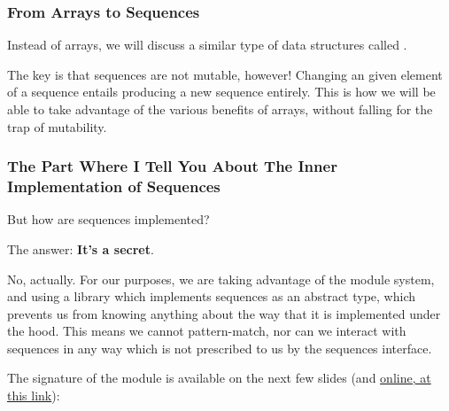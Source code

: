 \documentclass[aspectratio=169, handout]{beamer}
\begin{document}
\begin{frame}[fragile]
  \frametitle{From Arrays to Sequences}

  \tgs

  Instead of arrays, we will discuss a similar type of data structures called
  .

  \pause
  \vspace{\fill}


  \pause
  \vspace{\fill}

  The key is that sequences are not mutable, however! Changing an given element of
  a sequence entails producing a new sequence entirely. This is how we will be able
  to take advantage of the various benefits of arrays, without falling for the
  trap of mutability.

  \pause
  \vspace{\fill}

\end{frame}

\begin{frame}[fragile]
  \frametitle{The Part Where I Tell You About The Inner Implementation of Sequences}

  But how are sequences implemented?

  \pause
  \vspace{\fill}

  The answer: \textbf{It's a secret}.

  \pause
  \vspace{\fill}

  No, actually. For our purposes, we are taking advantage of the module system,
  and using a library which implements sequences as an abstract type, which
  prevents us from knowing anything about the way that it is implemented under
  the hood. This means we cannot pattern-match, nor can we interact with
  sequences in any way which is not prescribed to us by the sequences interface.

  \vspace{\fill}

  The signature of the  module is available on the next few slides (and
  {\color{blue}\href{http://www.cs.cmu.edu/~15150/resources/libraries/sequence.pdf}{online, at this link}}):
\end{frame}
\end{document}
